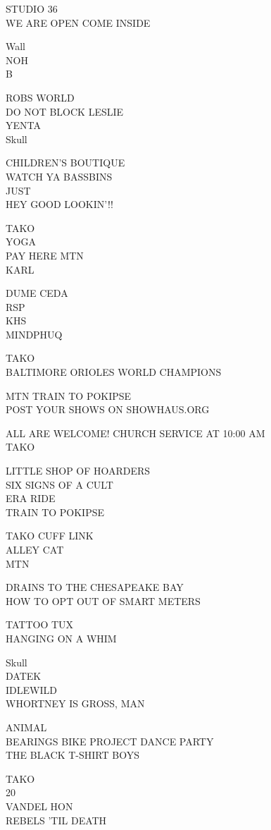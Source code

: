 \documentclass[10pt,letterpaper]{article}
\begin{document}
STUDIO 36\\
WE ARE OPEN COME INSIDE

Wall\\
NOH\\
B

ROBS WORLD\\
DO NOT BLOCK LESLIE\\
YENTA\\
Skull

CHILDREN'S BOUTIQUE\\
WATCH YA BASSBINS\\
JUST\\
HEY GOOD LOOKIN'!!

TAKO\\
YOGA\\
PAY HERE MTN\\
KARL

DUME CEDA\\
RSP\\
KHS\\
MINDPHUQ

TAKO\\
BALTIMORE ORIOLES WORLD CHAMPIONS

MTN TRAIN TO POKIPSE\\
POST YOUR SHOWS ON SHOWHAUS.ORG

ALL ARE WELCOME! CHURCH SERVICE AT 10:00 AM\\
TAKO

LITTLE SHOP OF HOARDERS\\
SIX SIGNS OF A CULT\\
ERA RIDE\\
TRAIN TO POKIPSE

TAKO CUFF LINK\\
ALLEY CAT\\
MTN

DRAINS TO THE CHESAPEAKE BAY\\
HOW TO OPT OUT OF SMART METERS

TATTOO TUX\\
HANGING ON A WHIM

Skull\\
DATEK\\
IDLEWILD\\
WHORTNEY IS GROSS, MAN

ANIMAL\\
BEARINGS BIKE PROJECT DANCE PARTY\\
THE BLACK T{-}SHIRT BOYS

TAKO\\
20\\
VANDEL HON\\
REBELS 'TIL DEATH
\end{document}
